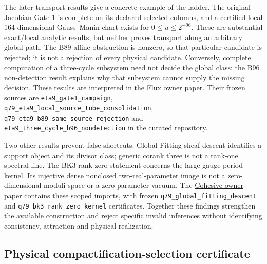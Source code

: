 \documentclass[11pt]{article}
\numberwithin{equation}{section}
\theoremstyle{definition}
\theoremstyle{plain}
\theoremstyle{remark}
\begin{document}
The later transport results give a concrete example of the ladder.
The original-Jacobian Gate 1 is complete on its declared selected columns,
and a certified local \(164\)-dimensional Gauss--Manin chart exists for
\(0\leq u\leq2^{-96}\). These are substantial exact/local analytic results,
but neither proves transport along an arbitrary global path.
The B89 affine obstruction is nonzero, so that particular candidate is
rejected; it is not a rejection of every physical candidate.
Conversely, complete computation of a three-cycle subsystem need not
decide the global class: the B96 non-detection result explains why that
subsystem cannot supply the missing decision. These results are interpreted
in the
\href{https://github.com/PeterNero/mtt-papers/tree/main/papers/flux-compactifications-in-heterotic-string-theory-expli-08b38155}{Flux owner paper}.
Their frozen sources are \nolinkurl{eta9_gate1_campaign},
\nolinkurl{q79_eta9_local_source_tube_consolidation},
\nolinkurl{q79_eta9_b89_same_source_rejection} and
\nolinkurl{eta9_three_cycle_b96_nondetection} in the curated repository.

Two other results prevent false shortcuts. Global Fitting-sheaf descent
identifies a support object and its divisor class; generic corank three is
not a rank-one spectral line. The BK3 rank-zero statement concerns the
large-gauge period kernel. Its injective dense nonclosed two-real-parameter
image is not a zero-dimensional moduli space or a zero-parameter vacuum.
The
\href{https://github.com/PeterNero/mtt-papers/tree/main/papers/cohesive-closure-repair-and-its-hodge-kernel-and-projection-shadows}{Cohesive owner paper}
contains these scoped imports, with frozen
\nolinkurl{q79_global_fitting_descent} and
\nolinkurl{q79_bk3_rank_zero_kernel} certificates.
Together these findings strengthen the available construction and reject
specific invalid inferences without identifying consistency, attraction
and physical realization.

\subsection{Physical compactification-selection certificate}
\end{document}
